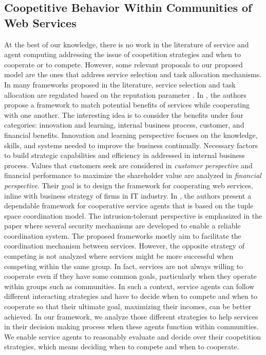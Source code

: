 \subsection{Coopetitive Behavior Within Communities of Web Services}\label{sec:coopetetive}

At the best of our knowledge, there is no work in the literature of service and agent computing addressing the issue of coopetition strategies and when to cooperate or to compete. However, some relevant proposals to our proposed model are the ones that address service selection and task allocation mechanisms. In many frameworks proposed in the literature, service selection and task allocation are regulated based on the reputation parameter \cite{Bentahar:2012:ARA:2343124.2343267,DBLP:journals/jwsr/RosarioBJ10,Ruth_Tu_2007-7,journals/kbs/Yahyaoui12}. In \cite{HuangCommunications}, the authors propose a framework to match potential benefits of services while cooperating with one another. The interesting idea is to consider the benefits under four categories: innovation and learning, internal business process, customer, and financial benefits. Innovation and learning perspective focuses on the knowledge, skills, and systems needed to improve the business continually. Necessary factors to build strategic capabilities and efficiency in addressed in internal business process. Values that customers seek are considered in \emph{customer perspective} and financial performance to maximize the shareholder value are analyzed in \emph{financial perspective}. Their goal is to design the framework for cooperating web services, inline with business strategy of firms in IT industry. In \cite{alchieri:a}, the authors present a dependable framework for cooperative service agents that is based on the tuple space coordination model. The intrusion-tolerant perspective is emphasized in the paper where several security mechanisms are developed to enable a reliable coordination system. %
The proposed frameworks mostly aim to facilitate the coordination mechanism between services. However, the opposite strategy of competing is not analyzed where services might be more successful when competing within the same group. In fact, services are not always willing to cooperate even if they have some common goals, particularly when they operate within groups such as communities. In such a context, service agents can follow different interacting strategies and have to decide when to compete and when to cooperate so that their ultimate goal, maximizing their incomes, can be better achieved. In our framework, we analyze those different strategies to help services in their decision making process when these
agents function within communities.
We enable service agents to reasonably evaluate and decide over their coopetition strategies, which means deciding when to compete and when to cooperate.



